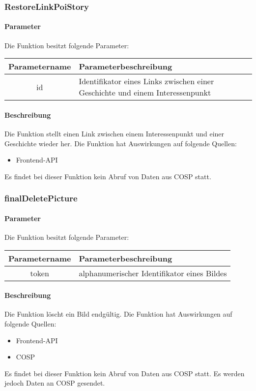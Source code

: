 \subsubsection{RestoreLinkPoiStory}
\paragraph{Parameter} Die Funktion besitzt folgende Parameter:
\begin{table}[H]
	\begin{tabular}{|c|p{11cm}|}
		\hline
		\textbf{Parametername} & \textbf{Parameterbeschreibung} \\ \hline
		id & Identifikator eines Links zwischen einer Geschichte und einem Interessenpunkt \\ \hline
	\end{tabular}
\end{table}
\paragraph{Beschreibung} Die Funktion stellt einen Link zwischen einem Interessenpunkt und einer Geschichte wieder her. Die Funktion hat Auswirkungen auf folgende Quellen:
\begin{itemize}
	\item Frontend-API
\end{itemize}
Es findet bei dieser Funktion kein Abruf von Daten aus {\glqq COSP\grqq} statt.
\subsubsection{finalDeletePicture}
\paragraph{Parameter} Die Funktion besitzt folgende Parameter:
\begin{table}[H]
	\begin{tabular}{|c|p{11cm}|}
		\hline
		\textbf{Parametername} & \textbf{Parameterbeschreibung} \\ \hline
		token & alphanumerischer Identifikator eines Bildes \\ \hline
	\end{tabular}
\end{table}
\paragraph{Beschreibung} Die Funktion löscht ein Bild endgültig. Die Funktion hat Auswirkungen auf folgende Quellen:
\begin{itemize}
	\item Frontend-API
	\item COSP
\end{itemize}
Es findet bei dieser Funktion kein Abruf von Daten aus {\glqq COSP\grqq} statt. Es werden jedoch Daten an {\glqq COSP\grqq} gesendet.
